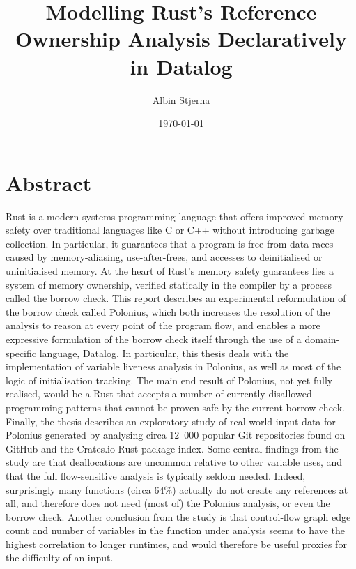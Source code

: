 \documentclass[11pt,a4paper,twoside,openany,draft]{report}
\author{Albin Stjerna}
\date{\today}
\title{Modelling Rust's Reference Ownership Analysis Declaratively in Datalog}
\begin{document}



\maketitle

\section*{Abstract}

Rust is a modern systems programming language that offers improved memory safety
over traditional languages like C or C++ without introducing garbage collection.
In particular, it guarantees that a program is free from data-races caused by
memory-aliasing, use-after-frees, and accesses to deinitialised or uninitialised
memory. At the heart of Rust's memory safety guarantees lies a system of memory
ownership, verified statically in the compiler by a process called the borrow
check. This report describes an experimental reformulation of the borrow check
called Polonius, which both increases the resolution of the analysis to reason
at every point of the program flow, and enables a more expressive formulation of
the borrow check itself through the use of a domain-specific language, Datalog.
In particular, this thesis deals with the implementation of variable liveness
analysis in Polonius, as well as most of the logic of initialisation tracking.
The main end result of Polonius, not yet fully realised, would be a Rust that
accepts a number of currently disallowed programming patterns that cannot be
proven safe by the current borrow check. Finally, the thesis describes an
exploratory study of real-world input data for Polonius generated by analysing
circa 12~000 popular Git repositories found on GitHub and the Crates.io Rust
package index. Some central findings from the study are that deallocations are
uncommon relative to other variable uses, and that the full flow-sensitive
analysis is typically seldom needed. Indeed, surprisingly many functions (circa
64\%) actually do not create any references at all, and therefore does not need
(most of) the Polonius analysis, or even the borrow check. Another conclusion
from the study is that control-flow graph edge count and number of variables in
the function under analysis seems to have the highest correlation to longer
runtimes, and would therefore be useful proxies for the difficulty of an input.
\end{document}
